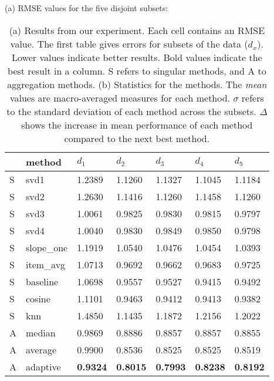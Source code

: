 \begin{table}
  
  \centering
  \caption[Results]{
    (a) Results from our experiment.
    Each cell contains an RMSE value.
    The first table gives errors for subsets of the data ($d_x$).
    Lower values indicate better results.
    Bold values indicate the best result in a column.
    S refers to singular methods, and A to aggregation methods.
    (b) Statistics for the methods.
    The \emph{mean} values are macro-averaged measures for each method. 
    $\sigma$ refers to the standard deviation of each method across the subsets.
    $\Delta$ shows the increase in mean performance of each method compared to the next best method.
  }
  \setlength{\extrarowheight}{0.2em}
  \vspace{0.5em}

  (a) RMSE values for the five disjoint subsets:

  \vspace{0.4em}

  \begin{tabular*}{0.47\textwidth}{ l l l l l l l }
    \hline
    { } & method & $d_1$ & $d_2$ & $d_3$ & $d_4$ & $d_5$ \\ 
    \hline
    S & svd1          & 1.2389	  & 1.1260	  & 1.1327	  & 1.1045	  & 1.1184	 \\
    S & svd2          & 1.2630	  & 1.1416    & 1.1260	  & 1.1458	  & 1.1260	 \\
    S & svd3          & 1.0061	  & 0.9825	  & 0.9830	  & 0.9815	  & 0.9797	 \\
    S & svd4          & 1.0040	  & 0.9830	  & 0.9849	  & 0.9850	  & 0.9798	 \\
    S & slope\_one    & 1.1919	  & 1.0540	  & 1.0476	  & 1.0454	  & 1.0393   \\
    S & item\_avg     & 1.0713	  & 0.9692	  & 0.9662	  & 0.9683	  & 0.9725	 \\
    S & baseline       & 1.0698	  & 0.9557	  & 0.9527	  & 0.9415	  & 0.9492	 \\
    S & cosine   	    & 1.1101	  & 0.9463	  & 0.9412	  & 0.9413	  & 0.9382	 \\
    S & knn       	  & 1.4850	  & 1.1435	  & 1.1872    & 1.2156	  & 1.2022	 \\
    \hline                                                                    
    A & median    	  & 0.9869	  & 0.8886	  & 0.8857    & 0.8857	  & 0.8855	 \\
    A & average    	  & 0.9900	  & 0.8536	  & 0.8525	  & 0.8525	  & 0.8519	 \\
    A & adaptive       & \textbf{0.9324}	  & \textbf{0.8015}	  & \textbf{0.7993}  & \textbf{0.8238} & \textbf{0.8192} \\
    \hline
  \end{tabular*}


\end{table}
